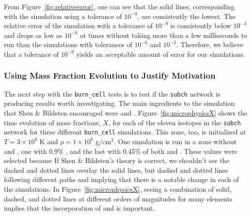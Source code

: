\documentclass[preprint]{aastex62}
\begin{document}
      From Figure~\ref{fig:relativeerror}, one can see that the solid lines, corresponding with the simulation using a tolerance of $10^{-9}$, are consistently the lowest. The relative error of the simulation with a tolerance of $10^{-9}$ is consistently below $10^{-3}$ and drops as low as $10^{-8}$ at times without taking more than a few milliseconds to run than the simulations with tolerances of $10^{-6}$ and $10^{-3}$. Therefore, we believe that a tolerance of $10^{-9}$ yields an acceptable amount of error for our simulations.
  
    \subsubsection{Using Mass Fraction Evolution to Justify Motivation}
    
      The next step with the {\tt burn\_cell} tests is to test if the {\tt subch} network is producing results worth investigating. The main ingredients to the simulation that Shen \& Bildsten encouraged were  and  \citep{shenNbildsten}. Figure~\ref{fig:microphysicsX} shows the time evolution of mass fractions, $X$, for each of the eleven isotopes in the {\tt subch} network for three different {\tt burn\_cell} simulations. This zone, too, is initialized at $T = 3 \times 10^8$ K and $\rho = 1 \times 10^6$ g/cm$^3$. One simulation is run in a zone without  and , one with 0.9\% , and the last with 0.45\% of both  and . These values were selected because  If Shen \& Bildsten's theory is correct, we shouldn't see the dashed and dotted lines overlay the solid lines, but dashed and dotted lines following different paths and implying that there is a notable change in each of the simulations. In Figure~\ref{fig:microphysicsX}, seeing a combination of solid, dashed, and dotted lines at different orders of magnitudes for many elements implies that the incorporation of  and  is important. 
      
\end{document}
